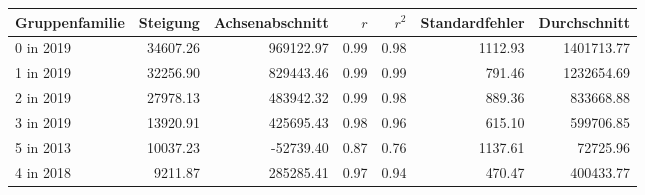 \begin{tabular}{lrrrrrr}
\toprule
Gruppenfamilie &  Steigung &  Achsenabschnitt &  $r$ &  $r^2$ &  Standardfehler &  Durchschnitt \\
\midrule
     0 in 2019 &  34607.26 &        969122.97 & 0.99 &   0.98 &         1112.93 &    1401713.77 \\
     1 in 2019 &  32256.90 &        829443.46 & 0.99 &   0.99 &          791.46 &    1232654.69 \\
     2 in 2019 &  27978.13 &        483942.32 & 0.99 &   0.98 &          889.36 &     833668.88 \\
     3 in 2019 &  13920.91 &        425695.43 & 0.98 &   0.96 &          615.10 &     599706.85 \\
     5 in 2013 &  10037.23 &        -52739.40 & 0.87 &   0.76 &         1137.61 &      72725.96 \\
     4 in 2018 &   9211.87 &        285285.41 & 0.97 &   0.94 &          470.47 &     400433.77 \\
\bottomrule
\end{tabular}
